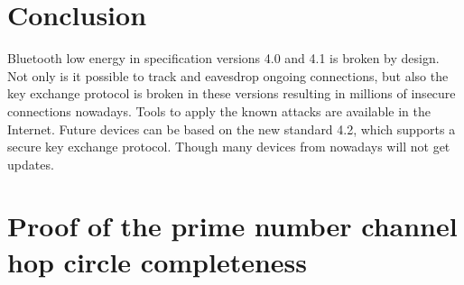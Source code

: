 \documentclass[conference]{IEEEtran}
\begin{document}



\section{Conclusion}
Bluetooth low energy in specification versions 4.0 and 4.1 is broken by design. 
Not only is it possible to track and eavesdrop ongoing connections, but also 
the key exchange protocol is broken in these versions resulting in millions of 
insecure connections nowadays. Tools to apply the known attacks are available 
in the Internet. Future devices can be based on the new standard 4.2, which 
supports a secure key exchange protocol. Though many devices from nowadays 
will not get updates.



%


\appendices
\section{Proof of the prime number channel hop circle completeness}
\end{document}
